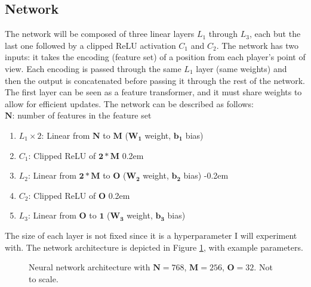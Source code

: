 \subsection{Network}

The network will be composed of three linear layers $L_1$ through $L_3$, each but the last one followed by a clipped ReLU activation $C_1$ and $C_2$. The network has two inputs: it takes the encoding (feature set) of a position from each player's point of view. Each encoding is passed through the same $L_1$ layer (same weights) and then the output is concatenated before passing it through the rest of the network. The first layer can be seen as a feature transformer, and it must share weights to allow for efficient updates. The network can be described as follows: \\

$\bm{N}$: number of features in the feature set

\begin{enumerate}
\itemsep-0.2em
\item $L_1 \times 2$: Linear from $\bm{N}$ to $\bm{M}$ ($\bm{W_1}$ weight, $\bm{b_1}$ bias)
\item $C_1$: Clipped ReLU of $\bm{2 * M}$
\itemsep0.2em
\item $L_2$: Linear from $\bm{2 * M}$ to $\bm{O}$ ($\bm{W_2}$ weight, $\bm{b_2}$ bias)
\itemsep-0.2em
\item $C_2$: Clipped ReLU of $\bm{O}$
\itemsep0.2em
\item $L_3$: Linear from $\bm{O}$ to $\bm{1}$ ($\bm{W_3}$ weight, $\bm{b_3}$ bias)
\end{enumerate}


The size of each layer is not fixed since it is a hyperparameter I will experiment with. The network architecture is depicted in Figure \ref{fig:network}, with example parameters.

\begin{figure}[H]
\centering
{}
\caption{Neural network architecture with $\bm{N}=768$, $\bm{M}=256$, $\bm{O}=32$. Not to scale.}
\label{fig:network}
\end{figure}

